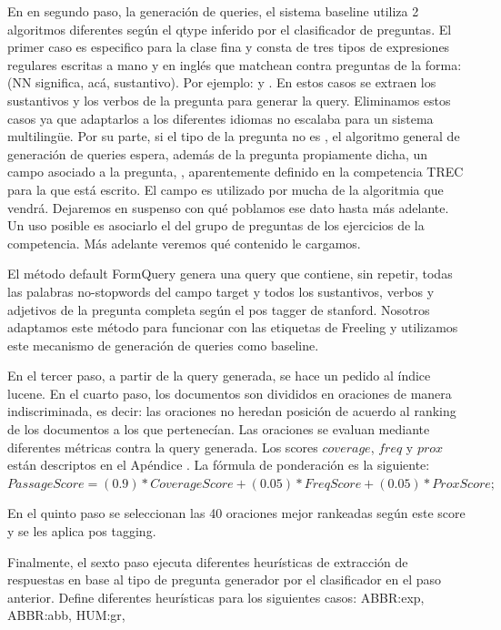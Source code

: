 En en segundo paso, la generación de queries, el sistema baseline utiliza 2 algoritmos diferentes según el qtype inferido por el clasificador de preguntas. El primer caso es especifico para la clase fina  y consta de tres tipos de expresiones regulares escritas a mano y en inglés que matchean contra preguntas de la forma:  (NN significa, acá, sustantivo). Por ejemplo:  y . En estos casos se extraen los sustantivos y los verbos de la pregunta para generar la query. Eliminamos estos casos ya que adaptarlos a los diferentes idiomas no escalaba para un sistema multilingüe. Por su parte, si el tipo de la pregunta no es , el algoritmo general de generación de queries espera, además de la pregunta propiamente dicha, un campo asociado a la pregunta, , aparentemente definido en la competencia TREC para la que está escrito. El campo  es utilizado por mucha de la algoritmia que vendrá. Dejaremos en suspenso con qué poblamos ese dato hasta más adelante. Un uso posible es asociarlo el  del grupo de preguntas de los ejercicios de la competencia. Más adelante veremos qué contenido le cargamos.


El método default FormQuery genera una query que contiene, sin repetir, todas las palabras no-stopwords del campo target y todos los sustantivos, verbos y adjetivos de la pregunta completa según el pos tagger de stanford. Nosotros adaptamos este método para funcionar con las etiquetas de Freeling y utilizamos este mecanismo de generación de queries como baseline.

En el tercer paso, a partir de la query generada, se hace un pedido al índice lucene. En el cuarto paso, los documentos son divididos en oraciones de manera indiscriminada, es decir: las oraciones no heredan posición de acuerdo al ranking de los documentos a los que pertenecían. Las oraciones se evaluan mediante diferentes métricas contra la query generada. Los scores $coverage$, $freq$ y $prox$ están descriptos en el Apéndice . La fórmula de ponderación es la siguiente: \\

$PassageScore = (0.9)*CoverageScore + (0.05)*FreqScore+ (0.05)*ProxScore;$

\medskip

En el quinto paso se seleccionan las 40 oraciones mejor rankeadas según este score y se les aplica pos tagging. 

Finalmente, el sexto paso ejecuta diferentes heurísticas de extracción de respuestas en base al tipo de pregunta generador por el clasificador en el paso anterior.
Define diferentes heurísticas para los siguientes casos: ABBR:exp, ABBR:abb, HUM:gr,\newline

